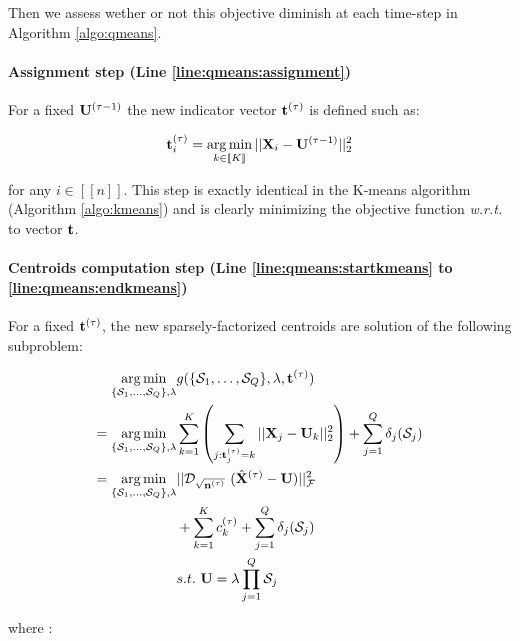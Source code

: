 Then we assess wether or not this objective diminish at each time-step in Algorithm \ref{algo:qmeans}.

\paragraph{Assignment step (Line \ref{line:qmeans:assignment})} For a fixed ${\mathbf{U}}^{(\tau-1)}$ the new indicator vector ${\mathbf{t}}^{(\tau)}$ is defined such as:

\begin{equation}
 {\mathbf{t}}^{(\tau)}_i = \operatorname*{arg\,min}_{k \in [\![K]\!]} ||{\mathbf{X}}_i - {\mathbf{U}}^{(\tau-1)}||_2^2
\end{equation}

for any $i \in [\![n]\!]$. This step is exactly identical in the K-means algorithm (Algorithm \ref{algo:kmeans}) and is clearly minimizing the objective function \textit{w.r.t.} to vector ${\mathbf{t}}$.

\paragraph{Centroids computation step (Line \ref{line:qmeans:startkmeans} to \ref{line:qmeans:endkmeans})} For a fixed ${\mathbf{t}}^{(\tau)}$, the new sparsely-factorized centroids are solution of the following subproblem:

\begin{equation}
\label{eq:qmeans_problem_t_fixed}
\begin{split}
 \operatorname*{arg\,min}_{\{ \mathcal{S}_1, \ldots,\mathcal{S}_Q\}, \lambda} & g(\{ \mathcal{S}_1, \ldots,\mathcal{S}_Q\}, \lambda, {\mathbf{t}}^{(\tau)}) \\
 = \operatorname*{arg\,min}_{\{ \mathcal{S}_1, \ldots,\mathcal{S}_Q\}, \lambda} &\sum_{k=1}^{K} \left( \sum_{j: {\mathbf{t}}^{(\tau)}_j = k} ||{\mathbf{X}}_j - {\mathbf{U}}_k||^2_2 \right) + \sum_{j=1}^{Q} \delta_j(\mathcal{S}_j)  \\
 = \operatorname*{arg\,min}_{\{ \mathcal{S}_1, \ldots,\mathcal{S}_Q\}, \lambda} & ||\mathcal{D}_{\sqrt{{\mathbf{n}}^{(\tau)}}}~(\hat{{\mathbf{X}}}^{(\tau)} - {\mathbf{U}})||_{\mathcal{F}} ^ 2  \\
 &+ \sum_{k=1}^{K} c_k^{(\tau)} + \sum_{j=1}^{Q} \delta_j(\mathcal{S}_j)\\
 & s.t. ~ {\mathbf{U}} = \lambda \prod_{j=1}^{Q}{\mathcal{S}_j}
\end{split} 
\end{equation}

where :


